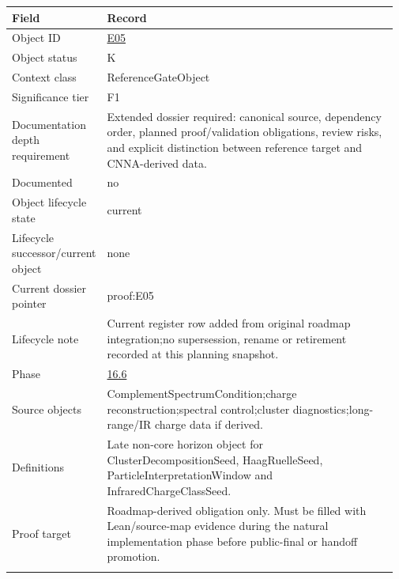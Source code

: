 \begin{longtable}{L{0.16\linewidth} L{0.81\linewidth}}
\hline
\textbf{Field} & \textbf{Record}\\
\hline
Object ID & \hyperlink{object-row-E05}{E05}\\
\hline\addlinespace[0.20em]
Object status & K\\
\hline\addlinespace[0.20em]
Context class & ReferenceGateObject\\
\hline\addlinespace[0.20em]
Significance tier & F1\\
\hline\addlinespace[0.20em]
Documentation depth requirement & Extended dossier required: canonical source, dependency order, planned proof/\allowbreak{}validation obligations, review risks, and explicit distinction between reference target and CNNA-derived data.\\
\hline\addlinespace[0.20em]
Documented & no\\
\hline\addlinespace[0.20em]
Object lifecycle state & current\\
\hline\addlinespace[0.20em]
Lifecycle successor/\allowbreak{}current object & none\\
\hline\addlinespace[0.20em]
Current dossier pointer & proof:E05\\
\hline\addlinespace[0.20em]
Lifecycle note & Current register row added from original roadmap integration;\newline no supersession, rename or retirement recorded at this planning snapshot.\\
\hline\addlinespace[0.20em]
Phase & \hyperlink{phase-row-16-6}{16.6}\\
\hline\addlinespace[0.20em]
Source objects & ComplementSpectrumCondition;\newline charge reconstruction;\newline spectral control;\newline cluster diagnostics;\newline long-range/\allowbreak{}IR charge data if derived.\\
\hline\addlinespace[0.20em]
Definitions & Late non-core horizon object for ClusterDecompositionSeed, HaagRuelleSeed, ParticleInterpretationWindow and InfraredChargeClassSeed.\\
\hline\addlinespace[0.20em]
Proof target & Roadmap-derived obligation only. Must be filled with Lean/\allowbreak{}source-map evidence during the natural implementation phase before public-final or handoff promotion.\\
\hline\addlinespace[0.20em]

\end{longtable}
